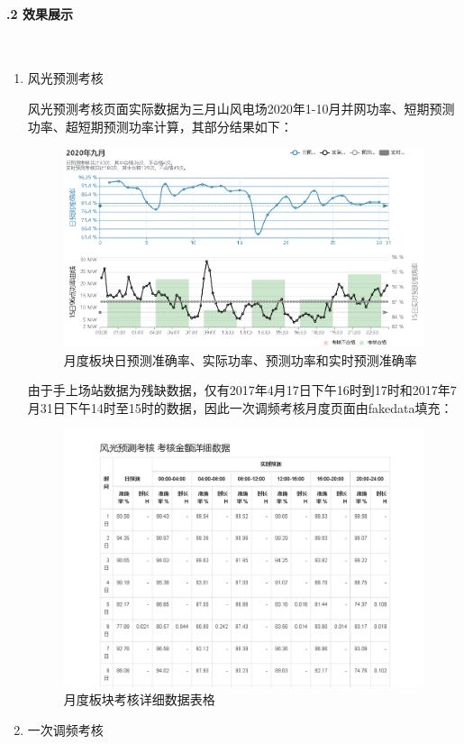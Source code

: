 \documentclass[winfonts,UTF8,a4paper]{ctexart}
\begin{document}
\paragraph{\thesubsubsection.2 效果展示}\ \\
\begin{enumerate}
	\item 风光预测考核
	
	风光预测考核页面实际数据为三月山风电场2020年1-10月并网功率、短期预测功率、超短期预测功率计算，其部分结果如下：
	\begin{figure}[H]
		\centering
		\includegraphics[width=0.7\linewidth]{pic/2020年九月}
		\caption{月度板块日预测准确率、实际功率、预测功率和实时预测准确率}
		\label{fig:2020}
	\end{figure}
	
	由于手上场站数据为残缺数据，仅有2017年4月17日下午16时到17时和2017年7月31日下午14时至15时的数据，因此一次调频考核月度页面由fakedata填充：
	\begin{figure}[H]
		\centering
		\includegraphics[width=0.7\linewidth]{pic/screenshot021}
		\caption{月度板块考核详细数据表格}
		\label{fig:screenshot021}
	\end{figure}
	\item 一次调频考核
	

\end{enumerate}
\end{document}
